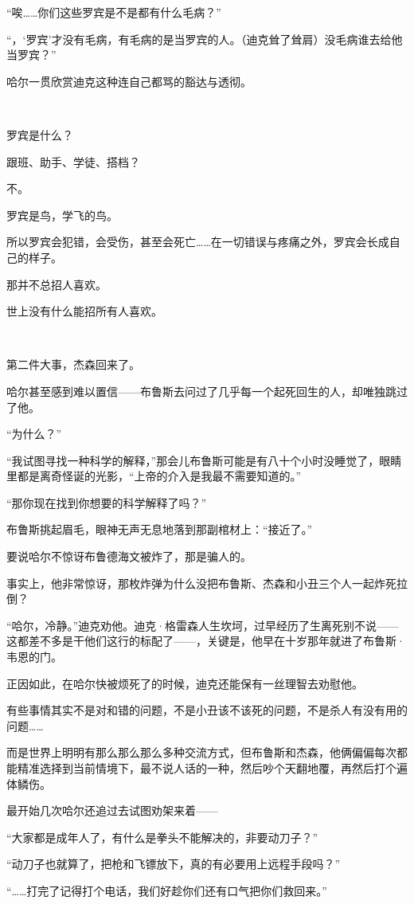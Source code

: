 \documentclass[../main]{subfiles}
\begin{document}
“唉……你们这些罗宾是不是都有什么毛病？”

“，‘罗宾’才没有毛病，有毛病的是当罗宾的人。（迪克耸了耸肩）没毛病谁去给他当罗宾？”

哈尔一贯欣赏迪克这种连自己都骂的豁达与透彻。

~\

罗宾是什么？

跟班、助手、学徒、搭档？

不。

罗宾是鸟，学飞的鸟。

所以罗宾会犯错，会受伤，甚至会死亡……在一切错误与疼痛之外，罗宾会长成自己的样子。

那并不总招人喜欢。

世上没有什么能招所有人喜欢。

~\

第二件大事，杰森回来了。

哈尔甚至感到难以置信——布鲁斯去问过了几乎每一个起死回生的人，却唯独跳过了他。

“为什么？”

“我试图寻找一种科学的解释，”那会儿布鲁斯可能是有八十个小时没睡觉了，眼睛里都是离奇怪诞的光影，“上帝的介入是我最不需要知道的。”

“那你现在找到你想要的科学解释了吗？”

布鲁斯挑起眉毛，眼神无声无息地落到那副棺材上：“接近了。”

要说哈尔不惊讶布鲁德海文被炸了，那是骗人的。

事实上，他非常惊讶，那枚炸弹为什么没把布鲁斯、杰森和小丑三个人一起炸死拉倒？

“哈尔，冷静。”迪克劝他。迪克·格雷森人生坎坷，过早经历了生离死别不说——这都差不多是干他们这行的标配了——，关键是，他早在十岁那年就进了布鲁斯·韦恩的门。

正因如此，在哈尔快被烦死了的时候，迪克还能保有一丝理智去劝慰他。

有些事情其实不是对和错的问题，不是小丑该不该死的问题，不是杀人有没有用的问题……

而是世界上明明有那么那么那么多种交流方式，但布鲁斯和杰森，他俩偏偏每次都能精准选择到当前情境下，最不说人话的一种，然后吵个天翻地覆，再然后打个遍体鳞伤。

最开始几次哈尔还追过去试图劝架来着——

“大家都是成年人了，有什么是拳头不能解决的，非要动刀子？”

“动刀子也就算了，把枪和飞镖放下，真的有必要用上远程手段吗？”

“……打完了记得打个电话，我们好趁你们还有口气把你们救回来。”
\end{document}

